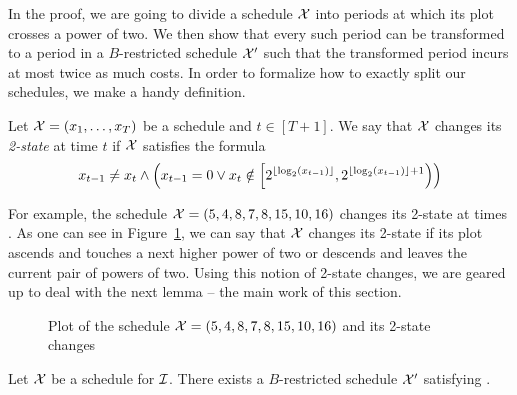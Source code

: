 In the proof, we are going to divide a schedule $\mathcal{X}$ into periods at which its plot crosses a power of two. We then show that every such period can be transformed to a period in a $B$-restricted schedule $\mathcal{X}'$ such that the transformed period incurs at most twice as much costs. In order to formalize how to exactly split our schedules, we make a handy definition.
\begin{defn}
Let $\mathcal{X}=(x_1,\dotsc,x_T)$ be a schedule and $t\in[T+1]$. We say that $\mathcal{X}$ changes its \emph{2-state} at time $t$ if $\mathcal{X}$ satisfies the formula
\begin{equation*}
	x_{t-1}\neq x_t\land \left(x_{t-1}=0 \lor x_t\notin\left[2^{\lfloor\log_2(x_{t-1})\rfloor},2^{\lfloor\log_2(x_{t-1})\rfloor+1}\right)\right)
\end{equation*}
\end{defn}
For example, the schedule $\mathcal{X}=(5,4,8,7,8,15,10,16)$ changes its 2-state at times . As one can see in Figure~\ref{fig:schedule_2_states}, we can say that $\mathcal{X}$ changes its 2-state if its plot ascends and touches a next higher power of two or descends and leaves the current pair of powers of two. Using this notion of 2-state changes, we are geared up to deal with the next lemma -- the main work of this section.
\begin{figure}[H]
\centering

\caption{Plot of the schedule $\mathcal{X}=(5,4,8,7,8,15,10,16)$ and its 2-state changes}
\label{fig:schedule_2_states}
\end{figure}
\begin{lem}\label{lem:transform_schedule_approx_2}
Let $\mathcal{X}$ be a schedule for $\mathcal{I}$. There exists a $B$-restricted schedule $\mathcal{X}'$ satisfying .
\end{lem}
